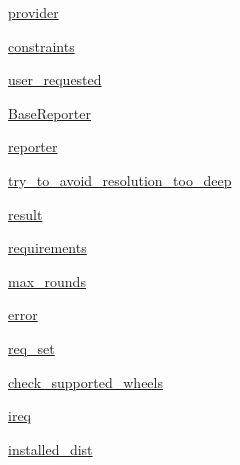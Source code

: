 \begin{DoxyCompactItemize}
\item 
\hyperlink{classpip_1_1__internal_1_1resolution_1_1resolvelib_1_1resolver_1_1Resolver_a703e0f514ab6fac7e87fb5d235bd2265}{provider}
\item 
\hyperlink{classpip_1_1__internal_1_1resolution_1_1resolvelib_1_1resolver_1_1Resolver_a23a029bcf2f16c359e87776d2a62249b}{constraints}
\item 
\hyperlink{classpip_1_1__internal_1_1resolution_1_1resolvelib_1_1resolver_1_1Resolver_a3c708b474201fee97e66deda9e052452}{user\+\_\+requested}
\item 
\hyperlink{classpip_1_1__internal_1_1resolution_1_1resolvelib_1_1resolver_1_1Resolver_a16ba8ec6d1d31f40f50d78115beb7268}{Base\+Reporter}
\item 
\hyperlink{classpip_1_1__internal_1_1resolution_1_1resolvelib_1_1resolver_1_1Resolver_af4920a678b06c4a197681ae6569e3589}{reporter}
\item 
\hyperlink{classpip_1_1__internal_1_1resolution_1_1resolvelib_1_1resolver_1_1Resolver_a5d6eeb80c4b82b6d9d6575a367b52459}{try\+\_\+to\+\_\+avoid\+\_\+resolution\+\_\+too\+\_\+deep}
\item 
\hyperlink{classpip_1_1__internal_1_1resolution_1_1resolvelib_1_1resolver_1_1Resolver_a754944adab3d0e6ab987cb438a9ff3e2}{result}
\item 
\hyperlink{classpip_1_1__internal_1_1resolution_1_1resolvelib_1_1resolver_1_1Resolver_ac2d6b1ac338dcb252b624e8d0d8befd8}{requirements}
\item 
\hyperlink{classpip_1_1__internal_1_1resolution_1_1resolvelib_1_1resolver_1_1Resolver_a2946ff625ce81df185bd7c6ccdf44cfb}{max\+\_\+rounds}
\item 
\hyperlink{classpip_1_1__internal_1_1resolution_1_1resolvelib_1_1resolver_1_1Resolver_af0e3781e07bc0274f39b9e4abdc9b7d7}{error}
\item 
\hyperlink{classpip_1_1__internal_1_1resolution_1_1resolvelib_1_1resolver_1_1Resolver_a4751c82fa0cc655faf5b0e6e1868cc50}{req\+\_\+set}
\item 
\hyperlink{classpip_1_1__internal_1_1resolution_1_1resolvelib_1_1resolver_1_1Resolver_aca2bd0c70cabc89002fb09bfaa6f367e}{check\+\_\+supported\+\_\+wheels}
\item 
\hyperlink{classpip_1_1__internal_1_1resolution_1_1resolvelib_1_1resolver_1_1Resolver_a641ebc252a5e64b82cd2fe201d2a690e}{ireq}
\item 
\hyperlink{classpip_1_1__internal_1_1resolution_1_1resolvelib_1_1resolver_1_1Resolver_affaf7f1f60e18a8393c09337c0c09068}{installed\+\_\+dist}

\end{DoxyCompactItemize}
